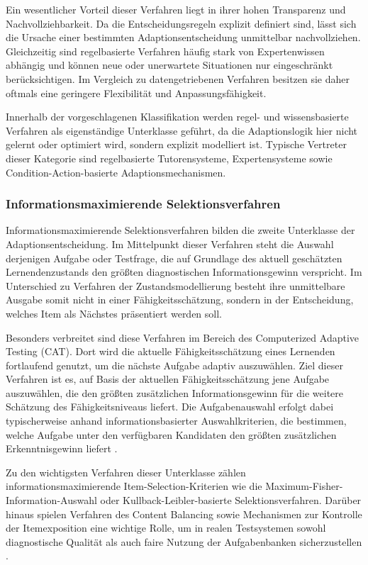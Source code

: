 Ein wesentlicher Vorteil dieser Verfahren liegt in ihrer hohen
Transparenz und Nachvollziehbarkeit. Da die Entscheidungsregeln explizit
definiert sind, lässt sich die Ursache einer bestimmten
Adaptionsentscheidung unmittelbar nachvollziehen. Gleichzeitig sind
regelbasierte Verfahren häufig stark von Expertenwissen abhängig und
können neue oder unerwartete Situationen nur eingeschränkt
berücksichtigen. Im Vergleich zu datengetriebenen Verfahren besitzen sie
daher oftmals eine geringere Flexibilität und Anpassungsfähigkeit.

Innerhalb der vorgeschlagenen Klassifikation werden regel- und
wissensbasierte Verfahren als eigenständige Unterklasse geführt, da die
Adaptionslogik hier nicht gelernt oder optimiert wird, sondern explizit
modelliert ist. Typische Vertreter dieser Kategorie sind regelbasierte
Tutorensysteme, Expertensysteme sowie Condition-Action-basierte
Adaptionsmechanismen.

\subsubsection{Informationsmaximierende
Selektionsverfahren}\label{informationsmaximierende-selektionsverfahren}

Informationsmaximierende Selektionsverfahren bilden die zweite
Unterklasse der Adaptionsentscheidung. Im Mittelpunkt dieser Verfahren
steht die Auswahl derjenigen Aufgabe oder Testfrage, die auf Grundlage
des aktuell geschätzten Lernendenzustands den größten diagnostischen
Informationsgewinn verspricht. Im Unterschied zu Verfahren der
Zustandsmodellierung besteht ihre unmittelbare Ausgabe somit nicht in
einer Fähigkeitsschätzung, sondern in der Entscheidung, welches Item als
Nächstes präsentiert werden soll.

Besonders verbreitet sind diese Verfahren im Bereich des Computerized
Adaptive Testing (CAT). Dort wird die aktuelle Fähigkeitsschätzung eines
Lernenden fortlaufend genutzt, um die nächste Aufgabe adaptiv
auszuwählen. Ziel dieser Verfahren ist es, auf Basis der aktuellen
Fähigkeitsschätzung jene Aufgabe auszuwählen, die den größten
zusätzlichen Informationsgewinn für die weitere Schätzung des
Fähigkeitsniveaus liefert. Die Aufgabenauswahl erfolgt dabei
typischerweise anhand informationsbasierter Auswahlkriterien, die
bestimmen, welche Aufgabe unter den verfügbaren Kandidaten den größten
zusätzlichen Erkenntnisgewinn liefert \citep{Liu2024}.

Zu den wichtigsten Verfahren dieser Unterklasse zählen
informationsmaximierende Item-Selection-Kriterien wie die
Maximum-Fisher-Information-Auswahl oder Kullback-Leibler-basierte
Selektionsverfahren. Darüber hinaus spielen Verfahren des Content
Balancing sowie Mechanismen zur Kontrolle der Itemexposition eine
wichtige Rolle, um in realen Testsystemen sowohl diagnostische Qualität
als auch faire Nutzung der Aufgabenbanken sicherzustellen
\citep{Liu2024}.

